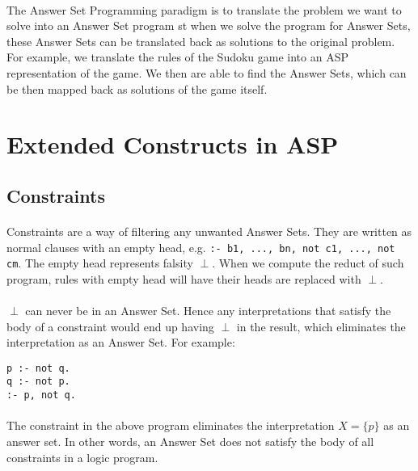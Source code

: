 \documentclass{article}
\theoremstyle{plain}
\theoremstyle{definition}
\begin{document}
\begin{multicols}{2}
\paragraph{} The Answer Set Programming paradigm is to translate the problem we want to solve into an Answer Set program st when we solve the program for Answer Sets, these Answer Sets can be translated back as solutions to the original problem. For example, we translate the rules of the Sudoku game into an ASP representation of the game. We then are able to find the Answer Sets, which can be then mapped back as solutions of the game itself.

\section{Extended Constructs in ASP}\label{sec:ASPExtendedConstructs}

\subsection{Constraints}

\paragraph{} Constraints are a way of filtering any unwanted Answer Sets. They are written as normal clauses with an empty head, e.g. \lstinline{:- b1, ..., bn, not c1, ..., not cm}. The empty head represents falsity $\perp$. When we compute the reduct of such program, rules with empty head will have their heads are replaced with $\perp$. 

\paragraph{} $\perp$ can never be in an Answer Set. Hence any interpretations that satisfy the body of a constraint would end up having $\perp$ in the result, which eliminates the interpretation as an Answer Set. For example:

\begin{lstlisting}
p :- not q.
q :- not p.
:- p, not q.
\end{lstlisting}

\paragraph{} The constraint in the above program eliminates the interpretation $X = \{p\}$ as an answer set. In other words, an Answer Set does not satisfy the body of all constraints in a logic program.


\end{multicols}
\end{document}
